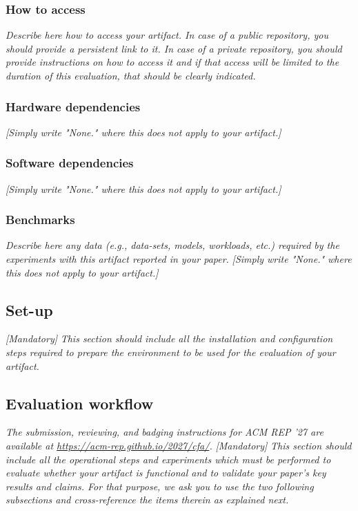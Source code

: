 \subsubsection{How to access}
\textit{Describe here how to access your artifact. In case of a public repository, you should provide a persistent link to it. In case of a private repository, you should provide instructions on how to access it and if that access will be limited to the duration of this evaluation, that should be clearly indicated.\\}

\subsubsection{Hardware dependencies}
\textit{[Simply write "None." where this does not apply to your artifact.]}

\subsubsection{Software dependencies} 
\textit{[Simply write "None." where this does not apply to your artifact.]}

\subsubsection{Benchmarks} 
\textit{Describe here any data (e.g., data-sets, models, workloads, etc.) required by the experiments with this artifact reported in your paper.} \textit{[Simply write "None." where this does not apply to your artifact.]}

\subsection{Set-up}

{\em [Mandatory]} \textit{This section should include all the installation and configuration steps required to prepare the environment to be used for the evaluation of your artifact.}

\subsection{Evaluation workflow}
\textit{The submission, reviewing, and badging instructions for ACM REP '27 are available at \url{https://acm-rep.github.io/2027/cfa/}.}
{\em [Mandatory]} \textit{This section should include all the operational steps and experiments which must be performed to evaluate whether your artifact is functional and to validate your paper's key results and claims. For that purpose, we ask you to use the two following subsections and cross-reference the items therein as explained next.}


